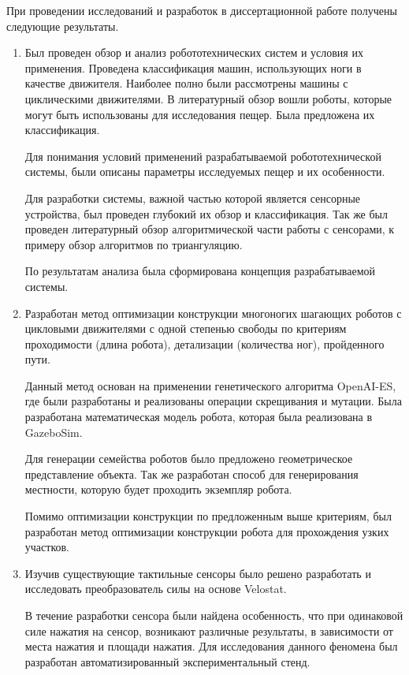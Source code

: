 При  проведении  исследований  и  разработок  в  диссертационной  работе  получены следующие результаты.
\begin{enumerate}
  \item Был проведен обзор и анализ робототехнических систем и условия их применения. Проведена классификация машин, использующих ноги в качестве движителя. Наиболее полно были рассмотрены машины с циклическими движителями. В литературный обзор вошли роботы, которые могут быть использованы для исследования пещер. Была предложена их классификация.

  Для понимания условий применений разрабатываемой робототехнической системы, были описаны параметры исследуемых пещер и их особенности.

  Для разработки системы, важной частью которой является сенсорные устройства, был проведен глубокий их обзор и классификация. Так же был проведен литературный обзор алгоритмической части работы с сенсорами, к примеру обзор алгоритмов по триангуляцию.

  По результатам анализа была сформирована концепция разрабатываемой системы.
  \item Разработан метод оптимизации конструкции многоногих шагающих роботов с цикловыми движителями с одной степенью свободы по критериям проходимости (длина робота), детализации (количества ног), пройденного пути.

  Данный метод основан на применении генетического алгоритма OpenAI-ES, где были разработаны и реализованы операции скрещивания и мутации. Была разработана математическая модель робота, которая была реализована в GazeboSim. 
  
  Для генерации семейства роботов было предложено геометрическое представление объекта. Так же разработан способ для генерирования местности, которую будет проходить экземпляр робота.

  Помимо оптимизации конструкции по предложенным выше критериям, был разработан метод оптимизации конструкции робота для прохождения узких участков.
  \item Изучив существующие тактильные сенсоры было решено разработать и исследовать преобразователь силы на основе Velostat.

  В течение разработки сенсора были найдена особенность, что при одинаковой силе нажатия на сенсор, возникают различные результаты, в зависимости от места нажатия и площади нажатия. Для исследования данного феномена был разработан автоматизированный экспериментальный стенд. 
  

\end{enumerate}
